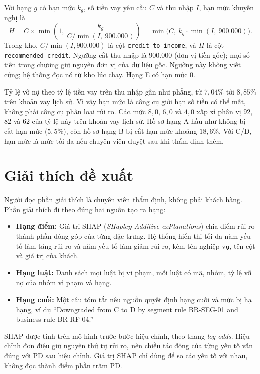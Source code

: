 Với hạng $g$ có hạn mức $k_g$, số tiền vay yêu cầu $C$ và thu nhập $I$, hạn mức khuyến nghị là
\begin{equation}
	H = C \times \min\left(1,\ \frac{k_g}{C / \min(I,\ 900.000)}\right) = \min\bigl(C,\ k_g \cdot \min(I,\ 900.000)\bigr).
\end{equation}
Trong kho, $C / \min(I, 900.000)$ là cột \texttt{credit\_to\_income}, và $H$ là cột \texttt{recommended\_credit}. Ngưỡng cắt thu nhập là $900.000$ (đơn vị tiền gốc); mọi số tiền trong chương giữ nguyên đơn vị của dữ liệu gốc. Ngưỡng này không viết cứng; hệ thống đọc nó từ kho lúc chạy. Hạng E có hạn mức $0$.

Tỷ lệ vỡ nợ theo tỷ lệ tiền vay trên thu nhập gần như phẳng, từ $7{,}04\%$ tới $8{,}85\%$ trên khoản vay lịch sử. Vì vậy hạn mức là công cụ giới hạn số tiền có thể mất, không phải công cụ phân loại rủi ro. Các mức $8{,}0$, $6{,}0$ và $4{,}0$ xấp xỉ phân vị $92$, $82$ và $62$ của tỷ lệ này trên khoản vay lịch sử. Hồ sơ hạng A hầu như không bị cắt hạn mức ($5{,}5\%$), còn hồ sơ hạng B bị cắt hạn mức khoảng $18{,}6\%$. Với C/D, hạn mức là mức tối đa nếu chuyên viên duyệt sau khi thẩm định thêm.

\section{Giải thích đề xuất}
\label{sec:dss-explain}

Người đọc phần giải thích là chuyên viên thẩm định, không phải khách hàng. Phần giải thích đi theo đúng hai nguồn tạo ra hạng:
\begin{itemize}[topsep=0pt, itemsep=1pt]
	\item \textbf{Hạng điểm:} Giá trị SHAP (\textit{SHapley Additive exPlanations}) chia điểm rủi ro thành phần đóng góp của từng đặc trưng. Hệ thống hiển thị tối đa năm yếu tố làm tăng rủi ro và năm yếu tố làm giảm rủi ro, kèm tên nghiệp vụ, tên cột và giá trị của khách.
	\item \textbf{Hạng luật:} Danh sách mọi luật bị vi phạm, mỗi luật có mã, nhóm, tỷ lệ vỡ nợ của nhóm vi phạm và hạng.
	\item \textbf{Hạng cuối:} Một câu tóm tắt nêu nguồn quyết định hạng cuối và mức bị hạ hạng, ví dụ ``Downgraded from C to D by segment rule BR-SEG-01 and business rule BR-RF-04.''
\end{itemize}

SHAP được tính trên mô hình trước bước hiệu chỉnh, theo thang \textit{log-odds}. Hiệu chỉnh đơn điệu giữ nguyên thứ tự rủi ro, nên chiều tác động của từng yếu tố vẫn đúng với PD sau hiệu chỉnh. Giá trị SHAP chỉ dùng để so các yếu tố với nhau, không đọc thành điểm phần trăm PD.

